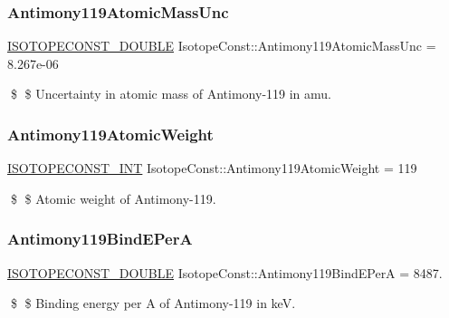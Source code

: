 \subsubsection{\texorpdfstring{Antimony119\+Atomic\+Mass\+Unc}{Antimony119AtomicMassUnc}}
{\footnotesize\ttfamily \mbox{\hyperlink{group___isotope_const-_macros_ga8f45a7272ce02c0b4c65c44636ed719a}{I\+S\+O\+T\+O\+P\+E\+C\+O\+N\+S\+T\+\_\+\+D\+O\+U\+B\+LE}} Isotope\+Const\+::\+Antimony119\+Atomic\+Mass\+Unc = 8.\+267e-\/06}

\$ \$ Uncertainty in atomic mass of Antimony-\/119 in amu. \mbox{\label{group___isotope_const-_antimony-_sb119_ga173858e2493beef44cb951646d981f60}} 
\subsubsection{\texorpdfstring{Antimony119\+Atomic\+Weight}{Antimony119AtomicWeight}}
{\footnotesize\ttfamily \mbox{\hyperlink{group___isotope_const-_macros_ga5f18360b3e99483a35c32d789e62621c}{I\+S\+O\+T\+O\+P\+E\+C\+O\+N\+S\+T\+\_\+\+I\+NT}} Isotope\+Const\+::\+Antimony119\+Atomic\+Weight = 119}

\$ \$ Atomic weight of Antimony-\/119. \mbox{\label{group___isotope_const-_antimony-_sb119_ga20e4263c03b32eecc8d3ee7f3dc00a13}} 
\subsubsection{\texorpdfstring{Antimony119\+Bind\+E\+PerA}{Antimony119BindEPerA}}
{\footnotesize\ttfamily \mbox{\hyperlink{group___isotope_const-_macros_ga8f45a7272ce02c0b4c65c44636ed719a}{I\+S\+O\+T\+O\+P\+E\+C\+O\+N\+S\+T\+\_\+\+D\+O\+U\+B\+LE}} Isotope\+Const\+::\+Antimony119\+Bind\+E\+PerA = 8487.}

\$ \$ Binding energy per A of Antimony-\/119 in keV. \mbox{\label{group___isotope_const-_antimony-_sb119_ga7f567fa45783d68c549a992948804d4e}} 

